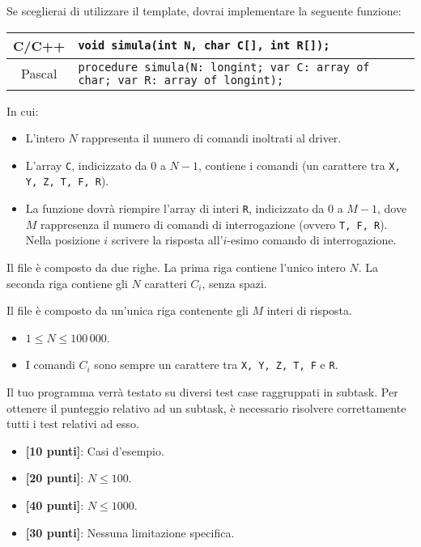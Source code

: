 Se sceglierai di utilizzare il template, dovrai implementare la seguente funzione:
\begin{center}\begin{tabularx}{\textwidth}{|c|X|}
\hline
C/C++  & \verb|void simula(int N, char C[], int R[]);|\\
\hline
Pascal & \verb|procedure simula(N: longint; var C: array of char; var R: array of longint);|\\
\hline
\end{tabularx}\end{center}
In cui:
\begin{itemize}[nolistsep]
  \item L'intero $N$ rappresenta il numero di comandi inoltrati al driver.
  \item L'array \texttt{C}, indicizzato da $0$ a $N-1$, contiene i comandi (un carattere tra \texttt{X, Y, Z, T, F, R}).
  \item La funzione dovrà riempire l'array di interi \texttt{R}, indicizzato da $0$ a $M-1$, dove $M$ rappresenza il numero di comandi di interrogazione (ovvero \texttt{T, F, R}). Nella posizione $i$ scrivere la risposta all'$i$-esimo comando di interrogazione.
\end{itemize}

\InputFile
Il file  è composto da due righe. La prima riga contiene l'unico intero $N$. La seconda riga contiene gli $N$ caratteri $C_i$, senza spazi.

\OutputFile
Il file \outputfile{} è composto da un'unica riga contenente gli $M$ interi di risposta.

\Constraints
\begin{itemize}[nolistsep, itemsep=2mm]
	\item $1 \le N \le 100\,000$.
	\item I comandi $C_i$ sono sempre un carattere tra \texttt{X, Y, Z, T, F} e \texttt{R}.
\end{itemize}

\Scoring
Il tuo programma verrà testato su diversi test case raggruppati in subtask.
Per ottenere il punteggio relativo ad un subtask, è necessario risolvere
correttamente tutti i test relativi ad esso.

\begin{itemize}[nolistsep,itemsep=2mm]
  \item \textbf{ [10 punti]}: Casi d'esempio.
  \item \textbf{ [20 punti]}: $N \leq 100$.
  \item \textbf{ [40 punti]}: $N \leq 1000$.
  \item \textbf{ [30 punti]}: Nessuna limitazione specifica.
\end{itemize}

